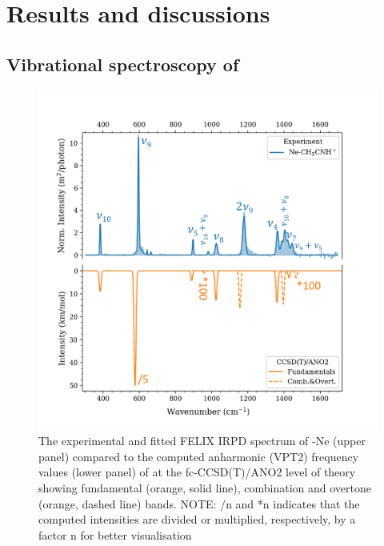 \section{Results and discussions}
\subsection{Vibrational spectroscopy of \texorpdfstring{\pa}{}}

\begin{figure}
	\centering
		\includegraphics[scale=.7]{chapters/CH3CNH+/figures/felix_1_rev.pdf}
	\caption{The experimental and fitted FELIX IRPD spectrum of \pan-Ne (upper panel) compared to the computed anharmonic (VPT2) frequency values (lower panel) of \pa at the fc-CCSD(T)/ANO2 level of theory showing fundamental (orange, solid line), combination and overtone (orange, dashed line) bands. NOTE: /n and *n indicates that the computed intensities are divided or multiplied, respectively, by a  factor n for better visualisation }
	\label{FIG:felix_1}
	
\end{figure}

